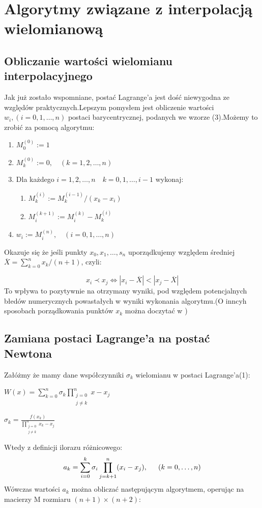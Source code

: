 \documentclass[11pt,wide]{article}
\begin{document}
\section{Algorytmy związane z interpolacją wielomianową}
\subsection{Obliczanie wartości wielomianu interpolacyjnego}
Jak już zostało wspomniane, postać Lagrange'a jest dość niewygodna ze względów praktycznych.Lepszym pomysłem jest obliczenie wartości $w_i, (i = 0,1,\ldots,n)$ postaci barycentrycznej, podanych we wzorze (3).Możemy to zrobić za pomocą algorytmu:
\begin{enumerate}
\item $M_0^{(0)} := 1$
\item $M_k^{(0)} := 0,\quad (k = 1,2,\ldots,n)$
\item Dla każdego $i = 1,2,\ldots,n \quad k = 0,1,\ldots,i-1$ wykonaj: 
\begin{enumerate}
\item $M_k^{(i)} := M_k^{(i-1)}/(x_k - x_i)$
\item $M_i^{(k+1)} := M_i^{(k)} - M_k^{(i)}$
\end{enumerate}
\item $w_i := M_i^{(n)}, \quad (i = 0,1,\ldots,n)$
\end{enumerate}
\noindent
Okazuje się że jeśli punkty $x_0,x_1,\ldots,s_n$ uporządkujemy względem średniej $\overline{X} = \displaystyle\sum_{k=0}^n x_k/(n+1)$, czyli:

\begin{equation}
x_i \prec x_j \Leftrightarrow |x_i - \overline{X}| < |x_j - \overline{X}|
\end{equation}
\noindent
To wpływa to pozytywnie na otrzymany wyniki, pod względem potencjalnych błedów numerycznych powastałych w wyniki wykonania algorytmu.(O inncyh sposobach porządkowania punktów $x_k$ można doczytać w \cite{werner})

\subsection{Zamiana postaci Lagrange'a na postać Newtona}
Załóżmy że mamy dane współczynniki $\sigma_k$ wielomianu w postaci Lagrange'a(1):
\begin{center}
$W(x) = \displaystyle\sum_{k = 0}^{n} \sigma_k\displaystyle\prod_{\substack{j=0\\j \neq k}}^n x-x_j$
\end{center}
\begin{center}
$\sigma_k = \frac{f(x_k)}{\displaystyle\prod_{\substack{j=0\\j \neq k}}^n x_k-x_j}$
\end{center}
Wtedy z definicji ilorazu różnicowego:
\begin{equation}
a_k = \displaystyle\sum_{i=0}^k \sigma_i \displaystyle\prod_{j = k+1}^n (x_i - x_j), \indent (k = 0,\ldots,n)
\end{equation}
Wówczas wartości $a_k$ można obliczać następującym algorytmem, operując na macierzy M rozmiaru $(n+1)\times (n+2)$:
\newpage
\end{document}
